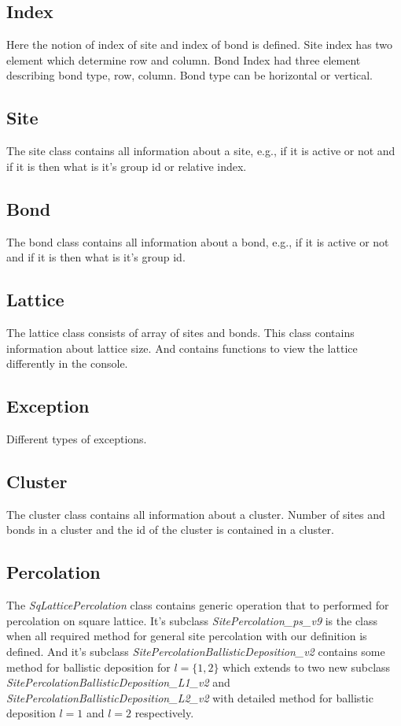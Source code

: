 	
	\subsection{Index}
	Here the notion of index of site and index of bond is defined. Site index has two element which determine row and column. Bond Index had three element describing bond type, row, column. Bond type can be horizontal or vertical.
		
	
	
	\subsection{Site}
	The site class contains all information about a site, e.g., if it is active or not and if it is then what is it's group id or relative index.
	
	
	\subsection{Bond}
	The bond class contains all information about a bond, e.g., if it is active or not and if it is then what is it's group id.
	
			
	\subsection{Lattice}
	The lattice class consists of array of sites and bonds. This class contains information about lattice size. And contains functions to view the lattice differently in the console.
	
	
	\subsection{Exception}
	Different types of exceptions.
	
	
	\subsection{Cluster}
	The cluster class contains all information about a cluster. Number of sites and bonds in a cluster and the id of the cluster is contained in a cluster.
	
	
	\subsection{Percolation}
	The \textit{SqLatticePercolation} class contains generic operation that to performed for percolation on square lattice. It's subclass  \textit{SitePercolation\_ps\_v9} is the class when all required method for general site percolation with our definition is defined. 
	And it's subclass \textit{SitePercolationBallisticDeposition\_v2}
	contains some method for ballistic deposition for $l=\{1,2\}$ which extends to two new subclass \textit{SitePercolationBallisticDeposition\_L1\_v2} and \textit{SitePercolationBallisticDeposition\_L2\_v2} with detailed method for ballistic deposition $l=1$ and $l=2$ respectively.
	
